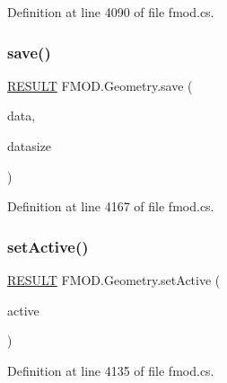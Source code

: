 Definition at line 4090 of file fmod.\+cs.

\mbox{\label{class_f_m_o_d_1_1_geometry_ab1c1659f4c3183ec0238ad2ce1bdcc12}} 
\subsubsection{\texorpdfstring{save()}{save()}}
{\footnotesize\ttfamily \hyperlink{namespace_f_m_o_d_a305d1176ef3f8c8815861a60407ac33d}{R\+E\+S\+U\+LT} F\+M\+O\+D.\+Geometry.\+save (\begin{DoxyParamCaption}\item[{Int\+Ptr}]{data,  }\item[{out int}]{datasize }\end{DoxyParamCaption})}



Definition at line 4167 of file fmod.\+cs.

\mbox{\label{class_f_m_o_d_1_1_geometry_a1d58b449d41ca263631a1789f037d6ea}} 
\subsubsection{\texorpdfstring{set\+Active()}{setActive()}}
{\footnotesize\ttfamily \hyperlink{namespace_f_m_o_d_a305d1176ef3f8c8815861a60407ac33d}{R\+E\+S\+U\+LT} F\+M\+O\+D.\+Geometry.\+set\+Active (\begin{DoxyParamCaption}\item[{bool}]{active }\end{DoxyParamCaption})}



Definition at line 4135 of file fmod.\+cs.

\mbox{\label{class_f_m_o_d_1_1_geometry_a3dea6ebfee0b6c91237b7136c3cf0b78}} 
